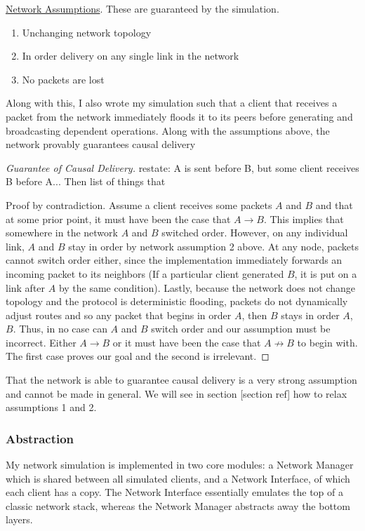 \documentclass[12pt,a4paper,twoside,openright]{report}
\begin{document}
		\underline{Network Assumptions}. These are guaranteed by the simulation.
		\begin{enumerate}
			\item Unchanging network topology
			\item In order delivery on any single link in the network
			\item No packets are lost
		\end{enumerate}
		
		Along with this, I also wrote my simulation such that a client that receives a packet from the network immediately floods it to its peers before generating and broadcasting dependent operations. Along with the assumptions above, the network provably guarantees causal delivery
		
		\begin{proof}[Guarantee of Causal Delivery]
		
			restate: 
			A is sent before B, but some client receives B before A...
			Then list of things that 
			
		
			Proof by contradiction. Assume a client receives some packets $A$ and $B$ and that at some prior point, it must have been the case that $A \rightarrow B$. This implies that somewhere in the network $A$ and $B$ switched order. However, on any individual link, $A$ and $B$ stay in order by network assumption 2 above. At any node, packets cannot switch order either, since the implementation immediately forwards an incoming packet to its neighbors (If a particular client generated $B$, it is put on a link after $A$ by the same condition). Lastly, because the network does not change topology and the protocol is deterministic flooding, packets do not dynamically adjust routes and so any packet that begins in order $A$, then $B$ stays in order $A$, $B$. Thus, in no case can $A$ and $B$ switch order and our assumption must be incorrect. Either $A \rightarrow B$ or it must have been the case that $A \not\rightarrow B$ to begin with. The first case proves our goal and the second is irrelevant.
		\end{proof}
		
		That the network is able to guarantee causal delivery is a very strong assumption and cannot be made in general. We will see in section [section ref] how to relax assumptions 1 and 2.
		
		\subsubsection{Abstraction}
		My network simulation is implemented in two core modules: a Network Manager which is shared between all simulated clients, and a Network Interface, of which each client has a copy. The Network Interface essentially emulates the top of a classic network stack, whereas the Network Manager abstracts away the bottom layers.
		
\end{document}
